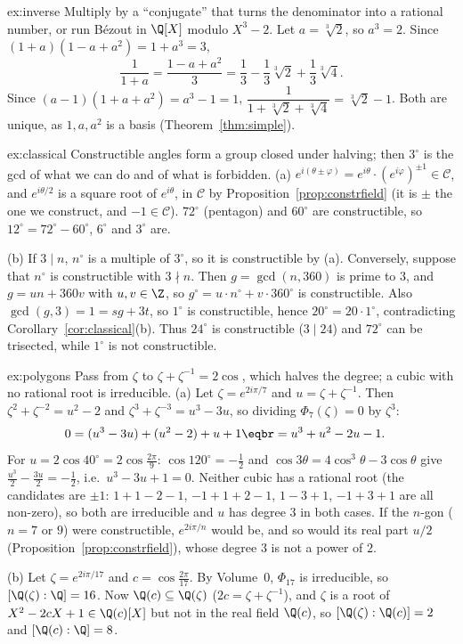 \begin{solution}{ex:inverse}
\idea Multiply by a ``conjugate'' that turns the denominator into a rational number, or run Bézout in $\Q[X]$ modulo $X^3-2$.
\writeup Let $a=\sqrt[3]2$, so $a^3=2$. Since $(1+a)(1-a+a^2)=1+a^3=3$,
\[
\frac1{1+a}=\frac{1-a+a^2}3=\frac13-\frac13\sqrt[3]2+\frac13\sqrt[3]4.
\]
Since $(a-1)(1+a+a^2)=a^3-1=1$, $\dfrac1{1+\sqrt[3]2+\sqrt[3]4}=\sqrt[3]2-1$. Both are unique, as $1,a,a^2$ is a basis (Theorem~\ref{thm:simple}).
\end{solution}

\begin{solution}{ex:classical}
\idea Constructible angles form a group closed under halving; then $3^\circ$ is the gcd of what we can do and of what is forbidden.
\writeup (a) $e^{i(\theta\pm\varphi)}=e^{i\theta}\cdot(e^{i\varphi})^{\pm1}\in\mathcal C$, and $e^{i\theta/2}$ is a square root of $e^{i\theta}$, in $\mathcal C$ by Proposition~\ref{prop:constrfield} (it is $\pm$ the one we construct, and $-1\in\mathcal C$). $72^\circ$ (pentagon) and $60^\circ$ are constructible, so $12^\circ=72^\circ-60^\circ$, $6^\circ$ and $3^\circ$ are.

(b) If $3\mid n$, $n^\circ$ is a multiple of $3^\circ$, so it is constructible by (a). Conversely, suppose that $n^\circ$ is constructible with $3\nmid n$. Then $g=\gcd(n,360)$ is prime to $3$, and $g=un+360v$ with $u,v\in\Z$, so $g^\circ=u\cdot n^\circ+v\cdot360^\circ$ is constructible. Also $\gcd(g,3)=1=sg+3t$, so $1^\circ$ is constructible, hence $20^\circ=20\cdot1^\circ$, contradicting Corollary~\ref{cor:classical}(b). Thus $24^\circ$ is constructible ($3\mid24$) and $72^\circ$ can be trisected, while $1^\circ$ is not constructible.
\end{solution}

\begin{solution}{ex:polygons}
\idea Pass from $\zeta$ to $\zeta+\zeta^{-1}=2\cos$, which halves the degree; a cubic with no rational root is irreducible.
\writeup (a) Let $\zeta=e^{2i\pi/7}$ and $u=\zeta+\zeta^{-1}$. Then $\zeta^2+\zeta^{-2}=u^2-2$ and $\zeta^3+\zeta^{-3}=u^3-3u$, so dividing $\Phi_7(\zeta)=0$ by $\zeta^3$:
\[
\begin{aligned}0&=(u^3-3u)+(u^2-2)+u+1\eqbr=u^3+u^2-2u-1.\end{aligned}
\]
For $u=2\cos40^\circ=2\cos\frac{2\pi}9$: $\cos120^\circ=-\frac12$ and $\cos3\theta=4\cos^3\theta-3\cos\theta$ give $\frac{u^3}2-\frac{3u}2=-\frac12$, i.e.\ $u^3-3u+1=0$. Neither cubic has a rational root (the candidates are $\pm1$: $1+1-2-1$, $-1+1+2-1$, $1-3+1$, $-1+3+1$ are all non-zero), so both are irreducible and $u$ has degree $3$ in both cases. If the $n$-gon ($n=7$ or $9$) were constructible, $e^{2i\pi/n}$ would be, and so would its real part $u/2$ (Proposition~\ref{prop:constrfield}), whose degree $3$ is not a power of $2$.

(b) Let $\zeta=e^{2i\pi/17}$ and $c=\cos\frac{2\pi}{17}$. By Volume~0, $\Phi_{17}$ is irreducible, so $[\Q(\zeta):\Q]=16$. Now $\Q(c)\subseteq\Q(\zeta)$ ($2c=\zeta+\zeta^{-1}$), and $\zeta$ is a root of $X^2-2cX+1\in\Q(c)[X]$ but not in the real field $\Q(c)$, so $[\Q(\zeta):\Q(c)]=2$ and $[\Q(c):\Q]=8$.
\end{solution}

